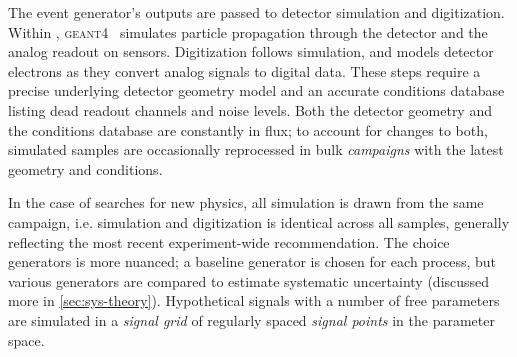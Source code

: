 The event generator's outputs are passed to detector simulation and digitization.
Within \atlas, \textsc{geant4}~\cite{geant} simulates particle propagation through the detector and the analog readout on sensors.
Digitization follows simulation, and models detector electrons as they convert analog signals to digital data.
These steps require a precise underlying detector geometry model and an accurate conditions database listing dead readout channels and noise levels.
Both the detector geometry and the conditions database are constantly in flux; to account for changes to both, simulated samples are occasionally reprocessed in bulk \emph{campaigns} with the latest geometry and conditions.

In the case of searches for new physics, all simulation is drawn from the same campaign, i.e. simulation and digitization is identical across all samples, generally reflecting the most recent experiment-wide recommendation.
The choice generators is more nuanced; a baseline generator is chosen for each process, but various generators are compared to estimate systematic uncertainty (discussed more in \cref{sec:sys-theory}).
Hypothetical signals with a number of free parameters are simulated in a \emph{signal grid} of regularly spaced \emph{signal points} in the parameter space.


